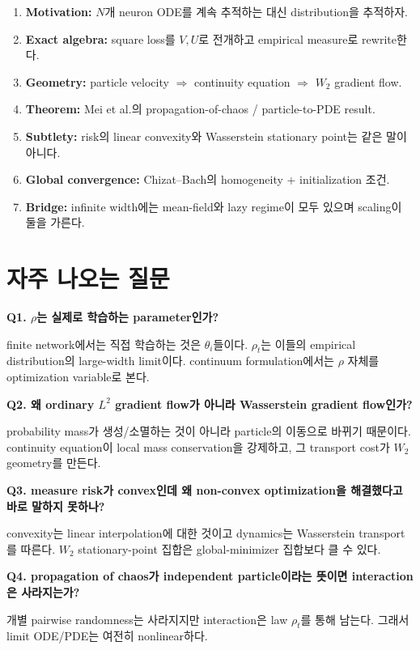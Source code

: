 \documentclass[11pt,a4paper,oneside,openany]{memoir}
\theoremstyle{definition}
\begin{document}
\begin{enumerate}
  \item \textbf{Motivation:} $N$개 neuron ODE를 계속 추적하는 대신 distribution을 추적하자.
  \item \textbf{Exact algebra:} square loss를 $V,U$로 전개하고 empirical measure로 rewrite한다.
  \item \textbf{Geometry:} particle velocity $\Rightarrow$ continuity equation $\Rightarrow$ $W_2$ gradient flow.
  \item \textbf{Theorem:} Mei et al.의 propagation-of-chaos / particle-to-PDE result.
  \item \textbf{Subtlety:} risk의 linear convexity와 Wasserstein stationary point는 같은 말이 아니다.
  \item \textbf{Global convergence:} Chizat--Bach의 homogeneity + initialization 조건.
  \item \textbf{Bridge:} infinite width에는 mean-field와 lazy regime이 모두 있으며 scaling이 둘을 가른다.
\end{enumerate}

\section{자주 나오는 질문}

\textbf{Q1. $\rho$는 실제로 학습하는 parameter인가?}

finite network에서는 직접 학습하는 것은 $\theta_i$들이다. $\rho_t$는 이들의 empirical distribution의
large-width limit이다. continuum formulation에서는 $\rho$ 자체를 optimization variable로 본다.

\textbf{Q2. 왜 ordinary $L^2$ gradient flow가 아니라 Wasserstein gradient flow인가?}

probability mass가 생성/소멸하는 것이 아니라 particle의 이동으로 바뀌기 때문이다.
continuity equation이 local mass conservation을 강제하고, 그 transport cost가 $W_2$ geometry를 만든다.

\textbf{Q3. measure risk가 convex인데 왜 non-convex optimization을 해결했다고 바로 말하지 못하나?}

convexity는 linear interpolation에 대한 것이고 dynamics는 Wasserstein transport를 따른다.
$W_2$ stationary-point 집합은 global-minimizer 집합보다 클 수 있다.

\textbf{Q4. propagation of chaos가 independent particle이라는 뜻이면 interaction은 사라지는가?}

개별 pairwise randomness는 사라지지만 interaction은 law $\rho_t$를 통해 남는다.
그래서 limit ODE/PDE는 여전히 nonlinear하다.
\end{document}
